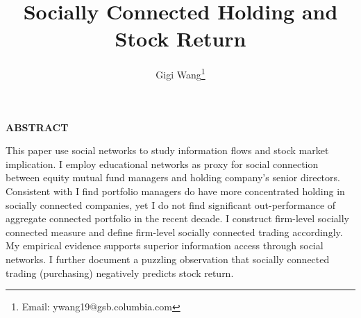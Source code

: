 \documentclass[11pt]{article}
\begin{document}
\onehalfspacing      %
\renewcommand{\footnote}{\endnote}  %

\author{Gigi Wang\thanks{Email: ywang19@gsb.columbia.com}}

\title{\huge \bf Socially Connected Holding and Stock Return}

\date{}              %

\maketitle
\thispagestyle{empty}

\bigskip

\centerline{\bf ABSTRACT}

\begin{doublespace}  %
  \noindent 
  This paper use social networks to study information flows and stock market implication. I employ educational networks as proxy for social connection between equity mutual fund managers and holding company's senior directors. Consistent with \cite{cohen2008small} I find portfolio managers do have more concentrated holding in socially connected companies, yet I do not find significant out-performance of aggregate connected portfolio in the recent decade. I construct firm-level socially connected measure and define firm-level socially connected trading accordingly. My empirical evidence supports superior information access through social networks. I further document a puzzling observation that socially connected trading (purchasing) negatively predicts stock return. 
\end{doublespace}

\medskip
\clearpage
\end{document}
